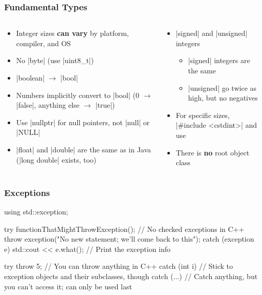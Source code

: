 \documentclass[glossy]{beamer}
\begin{document}
\begin{frame}[fragile=singleslide]
  \frametitle{Fundamental Types}
  \begin{columns}[t]
    \begin{column}{6cm}
      \begin{itemize}
        \item Integer sizes \textbf{can vary} by platform, compiler, and OS
        \item No \javainline|byte| (use \cppinline|uint8_t|)
        \item \javainline|boolean| $\rightarrow$ \cppinline|bool|
        \item Numbers implicitly convert to \cppinline|bool| (0 $\rightarrow$ \javainline|false|, anything else $\rightarrow$ \javainline|true|)
        \item Use \cppinline|nullptr| for null pointers, not \javainline|null| or \cppinline|NULL|
        \item \cppinline|float| and \cppinline|double| are the same as in Java (\cppinline|long double| exists, too)
      \end{itemize}
    \end{column}

    \begin{column}{6cm}
      \begin{itemize}
        \item \cppinline|signed| and \cppinline|unsigned| integers
        \begin{itemize}
          \item \cppinline|signed| integers are the same
          \item \cppinline|unsigned| go twice as high, but no negatives
        \end{itemize}
        \item For specific sizes, \cppinline|#include <cstdint>| and use 
        \item There is \textbf{no} root object class
      \end{itemize}
    \end{column}
  \end{columns}
\end{frame}

\begin{frame}[fragile=singleslide]
  \frametitle{Exceptions}
  \begin{cppcode}
using std::exception;

try {
  functionThatMightThrowException(); // No checked exceptions in C++
  throw exception("No new statement; we'll come back to this");
}
catch (exception e) {
  std::cout << e.what(); // Print the exception info
}

try {
  throw 5; // You can throw anything in C++
} catch (int i) {
  // Stick to exception objects and their subclasses, though
} catch (...) {
  // Catch anything, but you can't access it; can only be used last
}
  \end{cppcode}

\end{frame}
\end{document}
